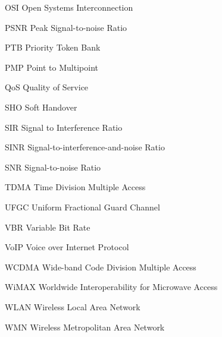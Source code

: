 \begin{denotation}
  \item[OSI] Open Systems Interconnection
  \item[PSNR] Peak Signal-to-noise Ratio 
  \item[PTB] Priority Token Bank
  \item[PMP] Point to Multipoint
  \item[QoS] Quality of Service
  \item[SHO] Soft Handover
  \item[SIR] Signal to Interference Ratio
  \item[SINR]Signal-to-interference-and-noise Ratio
  \item[SNR] Signal-to-noise Ratio
  \item[TDMA]Time Division Multiple Access
  \item[UFGC] Uniform Fractional Guard Channel
  \item[VBR] Variable Bit Rate
  \item[VoIP] Voice over Internet Protocol 
  \item[WCDMA] Wide-band Code Division Multiple Access
  \item[WiMAX] Worldwide Interoperability for Microwave Access
  \item[WLAN] Wireless Local Area Network
  \item[WMN] Wireless Metropolitan Area Network
\end{denotation}
